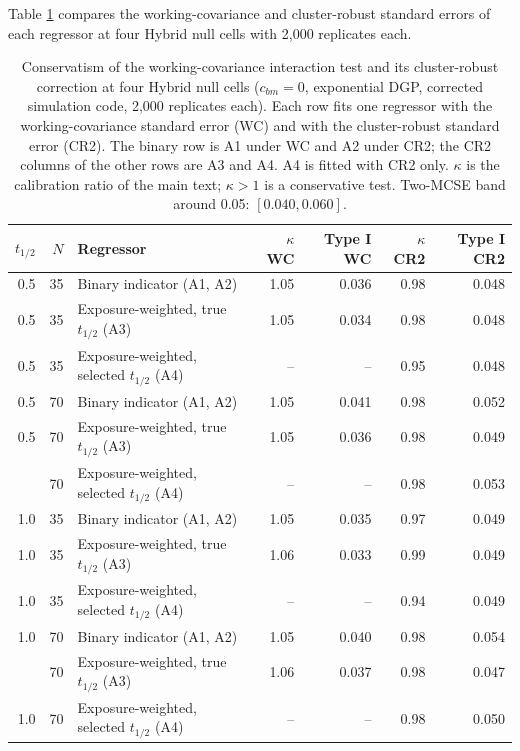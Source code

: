 \documentclass[
  11pt,
]{article}
\begin{document}
Table \ref{tab:tab-type1-cr2} compares the working-covariance and
cluster-robust standard errors of each regressor at four Hybrid null
cells with 2,000 replicates each.

\begin{table}
\centering
\caption{\label{tab:tab-type1-cr2}Conservatism of the working-covariance interaction
    test and its cluster-robust correction at four Hybrid null cells
    ($c_{bm} = 0$, exponential DGP, corrected simulation code,
    2{,}000 replicates each). Each row fits one regressor with the
    working-covariance standard error (WC) and with the cluster-robust
    standard error (CR2). The binary row is A1 under WC and A2 under
    CR2; the CR2 columns of the other rows are A3 and A4. A4 is fitted
    with CR2 only. $\kappa$ is the calibration ratio of the main text; $\kappa > 1$ is a conservative test.
    Two-MCSE band around 0.05: $[0.040, 0.060]$.}
\centering
\fontsize{9}{11}\selectfont
\begin{tabular}[t]{rrlrrrr}
\toprule
$t_{1/2}$ & $N$ & Regressor & $\kappa$ WC & Type I WC & $\kappa$ CR2 & Type I CR2\\
\midrule
0.5 & 35 & Binary indicator (A1, A2) & 1.05 & 0.036 & 0.98 & 0.048\\
0.5 & 35 & Exposure-weighted, true $t_{1/2}$ (A3) & 1.05 & 0.034 & 0.98 & 0.048\\
0.5 & 35 & Exposure-weighted, selected $t_{1/2}$ (A4) & -- & -- & 0.95 & 0.048\\
0.5 & 70 & Binary indicator (A1, A2) & 1.05 & 0.041 & 0.98 & 0.052\\
0.5 & 70 & Exposure-weighted, true $t_{1/2}$ (A3) & 1.05 & 0.036 & 0.98 & 0.049\\
\addlinespace
0.5 & 70 & Exposure-weighted, selected $t_{1/2}$ (A4) & -- & -- & 0.98 & 0.053\\
1.0 & 35 & Binary indicator (A1, A2) & 1.05 & 0.035 & 0.97 & 0.049\\
1.0 & 35 & Exposure-weighted, true $t_{1/2}$ (A3) & 1.06 & 0.033 & 0.99 & 0.049\\
1.0 & 35 & Exposure-weighted, selected $t_{1/2}$ (A4) & -- & -- & 0.94 & 0.049\\
1.0 & 70 & Binary indicator (A1, A2) & 1.05 & 0.040 & 0.98 & 0.054\\
\addlinespace
1.0 & 70 & Exposure-weighted, true $t_{1/2}$ (A3) & 1.06 & 0.037 & 0.98 & 0.047\\
1.0 & 70 & Exposure-weighted, selected $t_{1/2}$ (A4) & -- & -- & 0.98 & 0.050\\
\bottomrule
\end{tabular}
\end{table}
\end{document}
